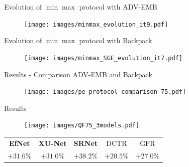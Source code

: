 \documentclass[10pt]{beamer}
\begin{document}



\begin{frame}{Evolution of $\min\max$ protocol with ADV-EMB}
   \begin{figure}
        \texttt{[image: images/minmax\_evolution\_it9.pdf]}
    \end{figure}

\end{frame}


\begin{frame}{Evolution of $\min\max$ protocol with Backpack}
    \begin{figure}
        \texttt{[image: images/minmax\_SGE\_evolution\_it7.pdf]}
    \end{figure}
\end{frame}



\begin{frame}{Results - Comparison ADV-EMB and Backpack}
    \begin{figure}[h]
        \texttt{[image: images/pe\_protocol\_comparison\_75.pdf]}
    \end{figure}
\end{frame}


\begin{frame}{Results}

    \begin{figure}[h]
        \texttt{[image: images/QF75\_3models.pdf]}
    \end{figure}
    \pause
    \begin{center}
        \begin{tabular}{ccccc}
           \textbf{EfNet} & \textbf{XU-Net} & \textbf{SRNet} & DCTR & GFR \\
           \alert{$+31.6 \%$} & \alert{$+31.0\%$} & \alert{$+38.2 \%$} & $+20.5\%$ & $+27.0 \%$
        \end{tabular}
    \end{center}
    
\end{frame}
\end{document}
